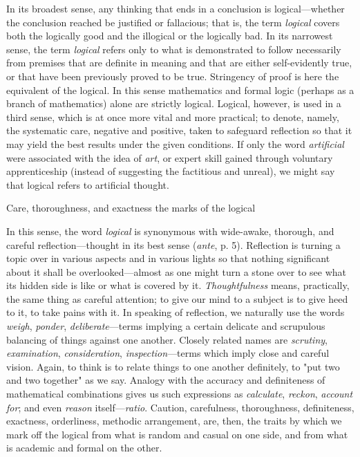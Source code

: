 \documentclass[letterpaper]{book}
\begin{document}
In its broadest sense, any thinking that ends in a conclusion is
logical---whether the conclusion reached be justified or fallacious;
that is, the term \emph{logical} covers both the logically good and the
illogical or the logically bad. In its narrowest sense, the term
\emph{logical} refers only to what is demonstrated to follow necessarily
from premises that are definite in meaning and that are either
self-evidently true, or that have been previously proved to be true.
Stringency of proof is here the equivalent of the logical. In this sense
mathematics and formal logic (perhaps as a branch of mathematics) alone
are strictly logical. Logical, however, is used in a third sense, which
is at once more vital and more practical; to denote, namely, the
systematic care, negative and positive, taken to safeguard reflection so
that it may yield the best results under the given conditions. If only
the word \emph{artificial} were associated with the
idea
of \emph{art}, or expert skill gained through voluntary apprenticeship
(instead of suggesting the factitious and unreal), we might say that
logical refers to artificial thought.

Care, thoroughness, and exactness the marks of the logical

In this sense, the word \emph{logical} is synonymous with wide-awake,
thorough, and careful reflection---thought in its best sense
(\emph{ante}, p. 5). Reflection is turning a topic over in various
aspects and in various lights so that nothing significant about it shall
be overlooked---almost as one might turn a stone over to see what its
hidden side is like or what is covered by it. \emph{Thoughtfulness}
means, practically, the same thing as careful attention; to give our
mind to a subject is to give heed to it, to take pains with it. In
speaking of reflection, we naturally use the words \emph{weigh},
\emph{ponder}, \emph{deliberate}---terms implying a certain delicate and
scrupulous balancing of things against one another. Closely related
names are \emph{scrutiny}, \emph{examination}, \emph{consideration},
\emph{inspection}---terms which imply close and careful vision. Again,
to think is to relate things to one another definitely, to "put two and
two together" as we say. Analogy with the accuracy and definiteness of
mathematical combinations gives us such expressions as \emph{calculate},
\emph{reckon}, \emph{account for}; and even \emph{reason}
itself---\emph{ratio}. Caution, carefulness, thoroughness, definiteness,
exactness, orderliness, methodic arrangement, are, then, the traits by
which we mark off the logical from what is random and casual on one
side, and from what is academic and formal on the other.
\end{document}
